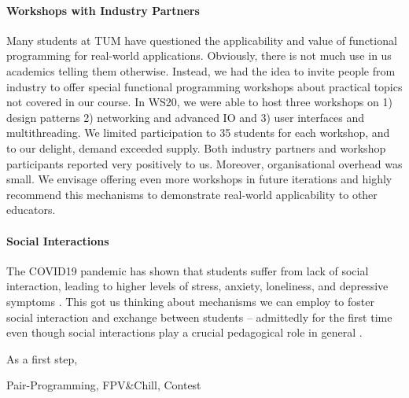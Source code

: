 \paragraph{Workshops with Industry Partners}
Many students at TUM have questioned the applicability and value of functional programming for real-world applications.
Obviously, there is not much use in us academics telling
them otherwise.
Instead, we had the idea to invite people from industry
to offer special functional programming workshops about
practical topics not covered in our course.
In WS20,
we were able to host three workshops on 1) design patterns
2) networking and advanced IO and 3) user interfaces and multithreading.
We limited participation to 35 students for each workshop,
and to our delight, demand exceeded supply.
Both industry partners and workshop participants
reported very positively to us.
Moreover, organisational overhead was small.
We envisage offering even more workshops in future iterations and highly recommend this mechanisms to demonstrate real-world applicability to other educators.

\paragraph{Social Interactions}
The COVID19 pandemic has shown that students suffer from lack of social interaction,
leading to higher levels of stress, anxiety, loneliness, and depressive symptoms \citep{students_lockdown1}.
This got us thinking about mechanisms we
can employ to foster social interaction and exchange between students -- admittedly for the first time even though social interactions play a crucial pedagogical role in general .

As a first step,

Pair-Programming, FPV\&Chill, Contest


